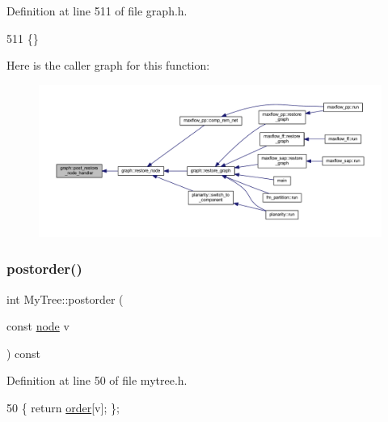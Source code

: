 Definition at line 511 of file graph.\+h.


\begin{DoxyCode}
511 \{\}
\end{DoxyCode}
Here is the caller graph for this function\+:
\nopagebreak
\begin{figure}[H]
\begin{center}
\leavevmode
\includegraphics[width=350pt]{classgraph_a2d555506de6aa30bb981f0b60375762d_icgraph}
\end{center}
\end{figure}
\mbox{\label{class_my_tree_a127a65f7b2ed2c17f84e2876281712bc}} 
\subsubsection{\texorpdfstring{postorder()}{postorder()}}
{\footnotesize\ttfamily int My\+Tree\+::postorder (\begin{DoxyParamCaption}\item[{const \mbox{\hyperlink{classnode}{node}}}]{v }\end{DoxyParamCaption}) const\hspace{0.3cm}{\ttfamily [inline]}}



Definition at line 50 of file mytree.\+h.


\begin{DoxyCode}
50 \{ \textcolor{keywordflow}{return} \mbox{\hyperlink{class_my_tree_afbd5fcfe2a1033b7b440bb2fcf55bb21}{order}}[v]; \};
\end{DoxyCode}
\mbox{\label{class_my_tree_ac375615ebccedd180aee25c5ea3f8ef1}} 
